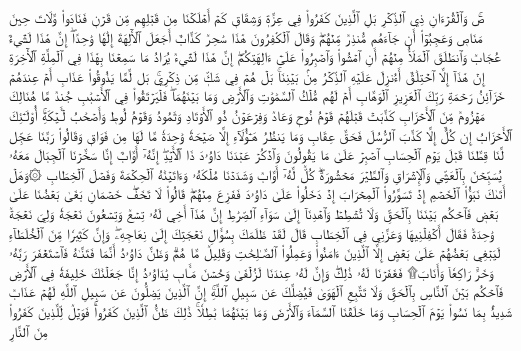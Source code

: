 صٓۚ وَٱلۡقُرۡءَانِ ذِي ٱلذِّكۡرِ
بَلِ ٱلَّذِينَ كَفَرُواْ فِي عِزَّةٖ وَشِقَاقٖ
كَمۡ أَهۡلَكۡنَا مِن قَبۡلِهِم مِّن قَرۡنٖ فَنَادَواْ وَّلَاتَ حِينَ مَنَاصٖ
وَعَجِبُوٓاْ أَن جَآءَهُم مُّنذِرٞ مِّنۡهُمۡۖ وَقَالَ ٱلۡكَٰفِرُونَ هَٰذَا سَٰحِرٞ كَذَّابٌ
أَجَعَلَ ٱلۡأٓلِهَةَ إِلَٰهٗا وَٰحِدًاۖ إِنَّ هَٰذَا لَشَيۡءٌ عُجَابٞ
وَٱنطَلَقَ ٱلۡمَلَأُ مِنۡهُمۡ أَنِ ٱمۡشُواْ وَٱصۡبِرُواْ عَلَىٰٓ ءَالِهَتِكُمۡۖ إِنَّ هَٰذَا لَشَيۡءٞ يُرَادُ
مَا سَمِعۡنَا بِهَٰذَا فِي ٱلۡمِلَّةِ ٱلۡأٓخِرَةِ إِنۡ هَٰذَآ إِلَّا ٱخۡتِلَٰقٌ
أَءُنزِلَ عَلَيۡهِ ٱلذِّكۡرُ مِنۢ بَيۡنِنَاۚ بَلۡ هُمۡ فِي شَكّٖ مِّن ذِكۡرِيۚ بَل لَّمَّا يَذُوقُواْ عَذَابِ
أَمۡ عِندَهُمۡ خَزَآئِنُ رَحۡمَةِ رَبِّكَ ٱلۡعَزِيزِ ٱلۡوَهَّابِ
أَمۡ لَهُم مُّلۡكُ ٱلسَّمَٰوَٰتِ وَٱلۡأَرۡضِ وَمَا بَيۡنَهُمَاۖ فَلۡيَرۡتَقُواْ فِي ٱلۡأَسۡبَٰبِ
جُندٞ مَّا هُنَالِكَ مَهۡزُومٞ مِّنَ ٱلۡأَحۡزَابِ
كَذَّبَتۡ قَبۡلَهُمۡ قَوۡمُ نُوحٖ وَعَادٞ وَفِرۡعَوۡنُ ذُو ٱلۡأَوۡتَادِ
وَثَمُودُ وَقَوۡمُ لُوطٖ وَأَصۡحَٰبُ لۡـَٔيۡكَةِۚ أُوْلَـٰٓئِكَ ٱلۡأَحۡزَابُ
إِن كُلٌّ إِلَّا كَذَّبَ ٱلرُّسُلَ فَحَقَّ عِقَابِ
وَمَا يَنظُرُ هَـٰٓؤُلَآءِ إِلَّا صَيۡحَةٗ وَٰحِدَةٗ مَّا لَهَا مِن فَوَاقٖ
وَقَالُواْ رَبَّنَا عَجِّل لَّنَا قِطَّنَا قَبۡلَ يَوۡمِ ٱلۡحِسَابِ
ٱصۡبِرۡ عَلَىٰ مَا يَقُولُونَ وَٱذۡكُرۡ عَبۡدَنَا دَاوُۥدَ ذَا ٱلۡأَيۡدِۖ إِنَّهُۥٓ أَوَّابٌ
إِنَّا سَخَّرۡنَا ٱلۡجِبَالَ مَعَهُۥ يُسَبِّحۡنَ بِٱلۡعَشِيِّ وَٱلۡإِشۡرَاقِ
وَٱلطَّيۡرَ مَحۡشُورَةٗۖ كُلّٞ لَّهُۥٓ أَوَّابٞ
وَشَدَدۡنَا مُلۡكَهُۥ وَءَاتَيۡنَٰهُ ٱلۡحِكۡمَةَ وَفَصۡلَ ٱلۡخِطَابِ
۞وَهَلۡ أَتَىٰكَ نَبَؤُاْ ٱلۡخَصۡمِ إِذۡ تَسَوَّرُواْ ٱلۡمِحۡرَابَ
إِذۡ دَخَلُواْ عَلَىٰ دَاوُۥدَ فَفَزِعَ مِنۡهُمۡۖ قَالُواْ لَا تَخَفۡۖ خَصۡمَانِ بَغَىٰ بَعۡضُنَا عَلَىٰ بَعۡضٖ فَٱحۡكُم بَيۡنَنَا بِٱلۡحَقِّ وَلَا تُشۡطِطۡ وَٱهۡدِنَآ إِلَىٰ سَوَآءِ ٱلصِّرَٰطِ
إِنَّ هَٰذَآ أَخِي لَهُۥ تِسۡعٞ وَتِسۡعُونَ نَعۡجَةٗ وَلِيَ نَعۡجَةٞ وَٰحِدَةٞ فَقَالَ أَكۡفِلۡنِيهَا وَعَزَّنِي فِي ٱلۡخِطَابِ
قَالَ لَقَدۡ ظَلَمَكَ بِسُؤَالِ نَعۡجَتِكَ إِلَىٰ نِعَاجِهِۦۖ وَإِنَّ كَثِيرٗا مِّنَ ٱلۡخُلَطَآءِ لَيَبۡغِي بَعۡضُهُمۡ عَلَىٰ بَعۡضٍ إِلَّا ٱلَّذِينَ ءَامَنُواْ وَعَمِلُواْ ٱلصَّـٰلِحَٰتِ وَقَلِيلٞ مَّا هُمۡۗ وَظَنَّ دَاوُۥدُ أَنَّمَا فَتَنَّـٰهُ فَٱسۡتَغۡفَرَ رَبَّهُۥ وَخَرَّۤ رَاكِعٗاۤ وَأَنَابَ۩
فَغَفَرۡنَا لَهُۥ ذَٰلِكَۖ وَإِنَّ لَهُۥ عِندَنَا لَزُلۡفَىٰ وَحُسۡنَ مَـَٔابٖ
يَٰدَاوُۥدُ إِنَّا جَعَلۡنَٰكَ خَلِيفَةٗ فِي ٱلۡأَرۡضِ فَٱحۡكُم بَيۡنَ ٱلنَّاسِ بِٱلۡحَقِّ وَلَا تَتَّبِعِ ٱلۡهَوَىٰ فَيُضِلَّكَ عَن سَبِيلِ ٱللَّهِۚ إِنَّ ٱلَّذِينَ يَضِلُّونَ عَن سَبِيلِ ٱللَّهِ لَهُمۡ عَذَابٞ شَدِيدُۢ بِمَا نَسُواْ يَوۡمَ ٱلۡحِسَابِ
وَمَا خَلَقۡنَا ٱلسَّمَآءَ وَٱلۡأَرۡضَ وَمَا بَيۡنَهُمَا بَٰطِلٗاۚ ذَٰلِكَ ظَنُّ ٱلَّذِينَ كَفَرُواْۚ فَوَيۡلٞ لِّلَّذِينَ كَفَرُواْ مِنَ ٱلنَّارِ
